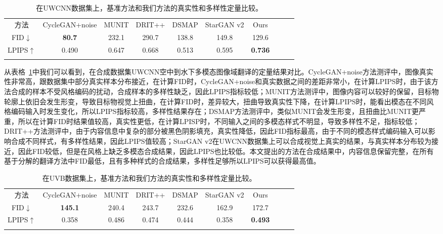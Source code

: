 \begin{table}[ht]
\centering
\caption{在UWCNN数据集上，基准方法和我们方法的真实性和多样性定量比较。}
  \begin{tabular}{c|ccccccccc}
    \hline\noalign{\smallskip}
    方法 & CycleGAN+noise & MUNIT & DRIT++ & DSMAP & StarGAN v2 & Ours \\
    \noalign{\smallskip}\hline\noalign{\smallskip}
    FID$\downarrow$ & \textbf{80.7} & 232.1 & 290.7 & 138.8 & 149.8 & 129.6          \\
    LPIPS$\uparrow$ & 0.490         & 0.647 & 0.668 & 0.513 & 0.595 & \textbf{0.736} \\
    \noalign{\smallskip}\hline
  \end{tabular}
  \label{tab:uwcnn_comparison}
\end{table}

从表格~\ref{tab:uwcnn_comparison}中我们可以看到，在合成数据集UWCNN空中到水下多模态图像域翻译的定量结果对比。CycleGAN+noise方法测评中，图像真实性非常高，跟数据集中部分真实样本分布接近，在计算FID时，CycleGAN+noise和真实数据之间的差距非常小，在计算LPIPS时，由于该方法合成的样本不受风格编码的扰动，合成样本的多样性缺乏，因此LPIPS指标较低；MUNIT方法测评中，图像内容可以较好的保留，目标物轮廓上依旧会发生形变，导致目标物视觉上扭曲，在计算FID时，差异较大，扭曲导致真实性下降，在计算LPIPS时，能看出模态在不同风格编码输入时发生变化，所以LPIPS指标较高，多样性结果存在；DSMAP方法测评中，类似MUNIT会发生形变，且扭曲比MUNIT更严重，所以在计算FID时结果值较高，真实性更低，在计算LPISP时，不同输入之间的多模态样式不明显，导致多样性不足，指标较低；DRIT++方法测评中，由于内容信息中复杂的部分被黑色阴影填充，真实性降低，因此FID指标最高，由于不同的模态样式编码输入可以影响合成不同样式，有多样性结果，因此LPIPS值较高；StarGAN v2在UWCNN数据集上可以合成视觉上真实的结果，与真实样本分布较为接近，因此FID较低，但是在风格上缺乏多模态合成结果，因此LPIPS也比较低。本文提出的方法在合成结果中，内容信息保留完整，在所有基于分解的翻译方法中FID最低，且有多种样式的合成结果，多样性足够所以LPIPS可以获得最高值。

\begin{table}[ht]
\centering
\caption{在UVB数据集上，基准方法和我们方法的真实性和多样性定量比较。}
  \begin{tabular}{c|ccccccccc}
    \hline\noalign{\smallskip}
    方法 & CycleGAN+noise & MUNIT & DRIT++ & DSMAP & StarGAN v2 & Ours \\
    \noalign{\smallskip}\hline\noalign{\smallskip}
    FID$\downarrow$ & \textbf{145.1} & 240.4 & 243.7 & 232.6 & 162.9 & 172.7          \\
    LPIPS$\uparrow$ & 0.358          & 0.486 & 0.474 & 0.444 & 0.358 & \textbf{0.493} \\
    \noalign{\smallskip}\hline
  \end{tabular}
  \label{tab:uvb_comparison}
\end{table}

